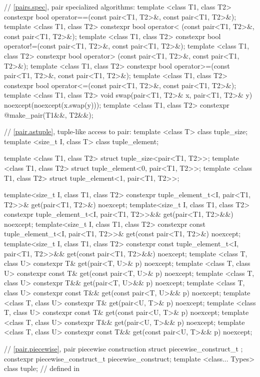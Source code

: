 \begin{codeblock}
{  // \ref{pairs.spec}, pair specialized algorithms:
  template <class T1, class T2>
    constexpr bool operator==(const pair<T1, T2>&, const pair<T1, T2>&);
  template <class T1, class T2>
    constexpr bool operator< (const pair<T1, T2>&, const pair<T1, T2>&);
  template <class T1, class T2>
    constexpr bool operator!=(const pair<T1, T2>&, const pair<T1, T2>&);
  template <class T1, class T2>
    constexpr bool operator> (const pair<T1, T2>&, const pair<T1, T2>&);
  template <class T1, class T2>
    constexpr bool operator>=(const pair<T1, T2>&, const pair<T1, T2>&);
  template <class T1, class T2>
    constexpr bool operator<=(const pair<T1, T2>&, const pair<T1, T2>&);
  template <class T1, class T2>
    void swap(pair<T1, T2>& x, pair<T1, T2>& y) noexcept(noexcept(x.swap(y)));
  template <class T1, class T2>
    constexpr @\seebelow@ make_pair(T1&&, T2&&);

  // \ref{pair.astuple}, tuple-like access to pair:
  template <class T> class tuple_size;
  template <size_t I, class T> class tuple_element;

  template <class T1, class T2> struct tuple_size<pair<T1, T2>>;
  template <class T1, class T2> struct tuple_element<0, pair<T1, T2>>;
  template <class T1, class T2> struct tuple_element<1, pair<T1, T2>>;

  template<size_t I, class T1, class T2>
    constexpr tuple_element_t<I, pair<T1, T2>>&
      get(pair<T1, T2>&) noexcept;
  template<size_t I, class T1, class T2>
    constexpr tuple_element_t<I, pair<T1, T2>>&&
      get(pair<T1, T2>&&) noexcept;
  template<size_t I, class T1, class T2>
    constexpr const tuple_element_t<I, pair<T1, T2>>&
      get(const pair<T1, T2>&) noexcept;
  template<size_t I, class T1, class T2>
    constexpr const tuple_element_t<I, pair<T1, T2>>&&
      get(const pair<T1, T2>&&) noexcept;
  template <class T, class U>
    constexpr T& get(pair<T, U>& p) noexcept;
  template <class T, class U>
    constexpr const T& get(const pair<T, U>& p) noexcept;
  template <class T, class U>
    constexpr T&& get(pair<T, U>&& p) noexcept;
  template <class T, class U>
    constexpr const T&& get(const pair<T, U>&& p) noexcept;
  template <class T, class U>
    constexpr T& get(pair<U, T>& p) noexcept;
  template <class T, class U>
    constexpr const T& get(const pair<U, T>& p) noexcept;
  template <class T, class U>
    constexpr T&& get(pair<U, T>&& p) noexcept;
  template <class T, class U>
    constexpr const T&& get(const pair<U, T>&& p) noexcept;

  // \ref{pair.piecewise}, pair piecewise construction
  struct piecewise_construct_t { };
  constexpr piecewise_construct_t piecewise_construct{};
  template <class... Types> class tuple;  // defined in 
}
\end{codeblock}

